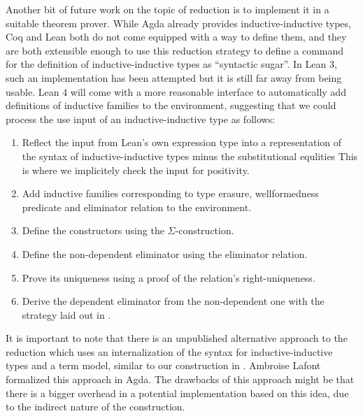 \begin{remark}
Another bit of future work on the topic of reduction is to implement it in a suitable
theorem prover.
While Agda already provides inductive-inductive types, Coq and Lean both
do not come equipped with a way to define them, and they are both extensible
enough to use this reduction strategy to define a command for the
definition of inductive-inductive types as ``syntactic sugar''.
In Lean 3, such an implementation has been attempted but it is still far away
from being usable.
Lean 4 will come with a more reasonable interface to automatically add definitions
of inductive families to the environment, suggesting that we could process
the use input of an inductive-inductive type as follows:
\begin{enumerate}
\item Reflect the input from Lean's own expression type  into
a representation of the syntax of inductive-inductive types minus the
substitutional equlities
This is where we implicitely check the input for positivity.
\item Add inductive families corresponding to type erasure, wellformedness
predicate and eliminator relation to the environment.
\item Define the constructors using the $\Sigma$-construction.
\item Define the non-dependent eliminator using the eliminator relation.
\item Prove its uniqueness using a proof of the relation's right-uniqueness.
\item Derive the dependent eliminator from the non-dependent one with the
strategy laid out in \citep{constructingqiits}.
\end{enumerate}
\end{remark}

\begin{remark}
It is important to note that there is an unpublished alternative approach to the
reduction which uses an internalization of the syntax for inductive-inductive types
and a term model, similar to our construction in .
Ambroise Lafont formalized this approach in Agda.
The drawbacks of this approach might be that there is a bigger overhead
in a potential implementation based on this idea,
due to the indirect nature of the construction.
\end{remark}
















